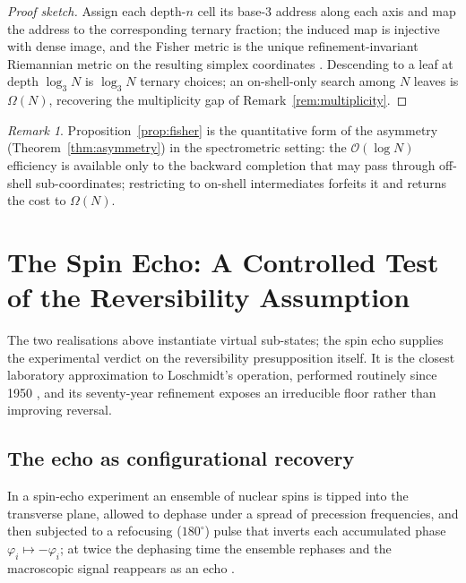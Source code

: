 \documentclass[11pt,a4paper]{article}
\theoremstyle{thmstyle}
\theoremstyle{definition}
\theoremstyle{remark}
\newtheorem{remark}[theorem]{Remark}
\newcommand{\phase}{\varphi}
\begin{document}
\begin{proof}[Proof sketch]
Assign each depth-$n$ cell its base-3 address along each axis and map the
address to the corresponding ternary fraction; the induced map is injective
with dense image, and the Fisher metric is the unique refinement-invariant
Riemannian metric on the resulting simplex coordinates
\citep{cencov1982,amari2016}. Descending to a leaf at depth $\log_3 N$ is
$\log_3 N$ ternary choices; an on-shell-only search among $N$ leaves is
$\Omega(N)$, recovering the multiplicity gap of
Remark~\ref{rem:multiplicity}.
\end{proof}

\begin{remark}
\label{rem:embeddingasymmetry}
Proposition~\ref{prop:fisher} is the quantitative form of the asymmetry
(Theorem~\ref{thm:asymmetry}) in the spectrometric setting: the
$\mathcal{O}(\log N)$ efficiency is available only to the backward
completion that may pass through off-shell sub-coordinates; restricting to
on-shell intermediates forfeits it and returns the cost to $\Omega(N)$.
\end{remark}

\section{The Spin Echo: A Controlled Test of the Reversibility Assumption}
\label{sec:echo}

The two realisations above instantiate virtual sub-states; the spin echo
supplies the experimental verdict on the reversibility presupposition
itself. It is the closest laboratory approximation to Loschmidt's
operation, performed routinely since 1950 \citep{hahn1950}, and its
seventy-year refinement exposes an irreducible floor rather than improving
reversal.

\subsection{The echo as configurational recovery}
\label{sec:echorecovery}

In a spin-echo experiment an ensemble of nuclear spins is tipped into the
transverse plane, allowed to dephase under a spread of precession
frequencies, and then subjected to a refocusing ($180^\circ$) pulse that
inverts each accumulated phase $\phase_i\mapsto-\phase_i$; at twice the
dephasing time the ensemble rephases and the macroscopic signal reappears
as an echo \citep{hahn1950}.
\end{document}
